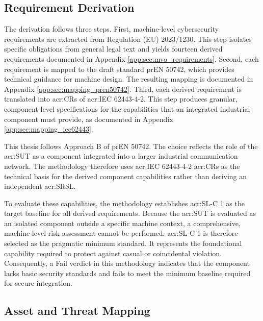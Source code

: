 \subsection{Requirement Derivation} 
\label{subsec:derivation_mapping} 

The derivation follows three steps. First, machine-level cybersecurity requirements are extracted from Regulation (EU) 2023/1230. This step isolates specific obligations from general legal text and yields fourteen derived requirements documented in Appendix \ref{app:sec:mvo_requirements}. Second, each requirement is mapped to the draft standard prEN 50742, which provides technical guidance for machine design. The resulting mapping is documented in Appendix \ref{app:sec:mapping_pren50742}. Third, each derived requirement is translated into \glspl{acr:CR} of \gls{acr:IEC} 62443-4-2. This step produces granular, component-level specifications for the capabilities that an integrated industrial component must provide, as documented in Appendix \ref{app:sec:mapping_iec62443}. 


This thesis follows Approach B of prEN 50742. The choice reflects the role of the \gls{acr:SUT} as a component integrated into a larger industrial communication network. The methodology therefore uses \gls{acr:IEC} 62443-4-2 \glspl{acr:CR} as the technical basis for the derived component capabilities rather than deriving an independent \gls{acr:SRSL}. 

To evaluate these capabilities, the methodology establishes \gls{acr:SL-C} 1 as the target baseline for all derived requirements. Because the \gls{acr:SUT} is evaluated as an isolated component outside a specific machine context, a comprehensive, machine-level risk assessment cannot be performed. \gls{acr:SL-C} 1 is therefore selected as the pragmatic minimum standard. It represents the foundational capability required to protect against casual or coincidental violation. Consequently, a Fail verdict in this methodology indicates that the component lacks basic security standards and fails to meet the minimum baseline required for secure integration.

\subsection{Asset and Threat Mapping} 
\label{subsec:asset_threat_mapping} 

